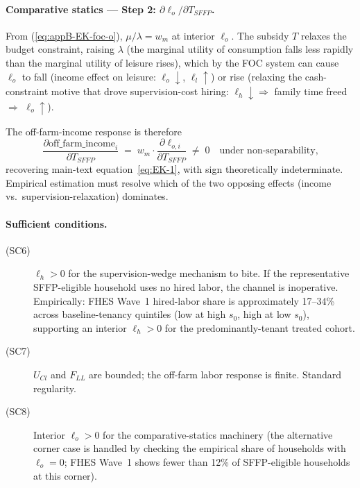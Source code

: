 \documentclass[11pt, a4paper]{article}
\begin{document}
\paragraph{Comparative statics --- Step 2: $\partial \ell_o / \partial T_{SFFP}$.}
From (\ref{eq:appB-EK-foc-o}), $\mu/\lambda = w_m$ at interior $\ell_o$. The
subsidy $T$ relaxes the budget constraint, raising $\lambda$ (the marginal
utility of consumption falls less rapidly than the marginal utility of
leisure rises), which by the FOC system can cause $\ell_o$ to fall (income
effect on leisure: $\ell_o \downarrow$, $\ell_l \uparrow$) or rise (relaxing
the cash-constraint motive that drove supervision-cost hiring: $\ell_h \downarrow
\Rightarrow$ family time freed $\Rightarrow$ $\ell_o \uparrow$).

The off-farm-income response is therefore
\begin{equation}
\boxed{\frac{\partial \text{off\_farm\_income}_i}{\partial T_{SFFP}} \;=\; w_m \cdot \frac{\partial \ell_{o,i}}{\partial T_{SFFP}} \;\ne\; 0 \quad \text{under non-separability,}}
\label{eq:appB-EK-step2}
\end{equation}
recovering main-text equation~\ref{eq:EK-1}, with sign theoretically
indeterminate. Empirical estimation must resolve which of the two opposing
effects (income vs.\ supervision-relaxation) dominates.

\paragraph{Sufficient conditions.}
\begin{description}
\item[(SC6)] $\ell_h > 0$ for the supervision-wedge mechanism to bite. If the
  representative SFFP-eligible household uses no hired labor, the channel is
  inoperative. Empirically: FHES Wave~1 hired-labor share is approximately
  17--34\% across baseline-tenancy quintiles (low at high $s_0$, high at low
  $s_0$), supporting an interior $\ell_h > 0$ for the predominantly-tenant
  treated cohort.
\item[(SC7)] $U_{Cl}$ and $F_{LL}$ are bounded; the off-farm labor response is
  finite. Standard regularity.
\item[(SC8)] Interior $\ell_o > 0$ for the comparative-statics machinery (the
  alternative corner case is handled by checking the empirical share of
  households with $\ell_o = 0$; FHES Wave~1 shows fewer than 12\% of
  SFFP-eligible households at this corner).
\end{description}
\end{document}

